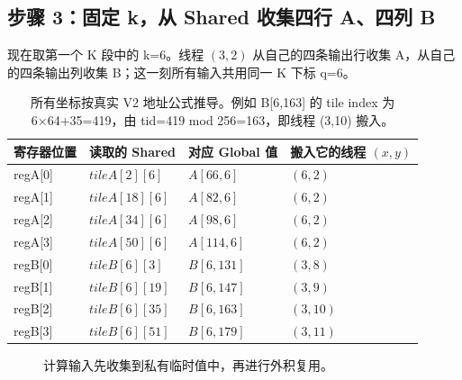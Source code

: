 \subsection{步骤 3：固定 k，从 Shared 收集四行 A、四列 B}
现在取第一个 K 段中的 k=6。线程 $(3,2)$ 从自己的四条输出行收集 A，从自己的四条输出列收集 B；这一刻所有输入共用同一 K 下标 q=6。

\begin{table}[H]\centering\small
\begin{tabular}{llll}
\toprule
寄存器位置 & 读取的 Shared & 对应 Global 值 & 搬入它的线程 $(x,y)$\\\midrule
regA[0] & $tileA[2][6]$ & $A[66,6]$ & $(6,2)$\\
regA[1] & $tileA[18][6]$ & $A[82,6]$ & $(6,2)$\\
regA[2] & $tileA[34][6]$ & $A[98,6]$ & $(6,2)$\\
regA[3] & $tileA[50][6]$ & $A[114,6]$ & $(6,2)$\\\midrule
regB[0] & $tileB[6][3]$ & $B[6,131]$ & $(3,8)$\\
regB[1] & $tileB[6][19]$ & $B[6,147]$ & $(3,9)$\\
regB[2] & $tileB[6][35]$ & $B[6,163]$ & $(3,10)$\\
regB[3] & $tileB[6][51]$ & $B[6,179]$ & $(3,11)$\\\bottomrule
\end{tabular}
\caption{所有坐标按真实 V2 地址公式推导。例如 B[6,163] 的 tile index 为 6×64+35=419，由 tid=419 mod 256=163，即线程 (3,10) 搬入。}
\end{table}
\begin{figure}[H]\centering
{}
\caption{计算输入先收集到私有临时值中，再进行外积复用。}
\end{figure}
\pagebreakhere

